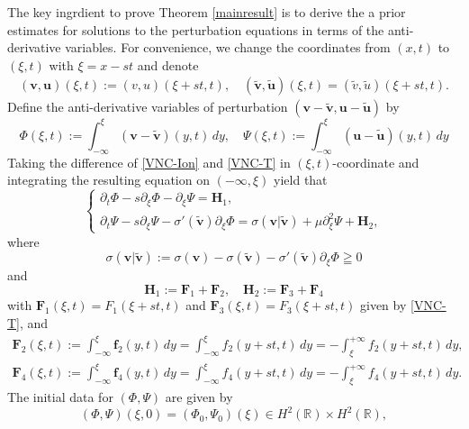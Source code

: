 \documentclass[12pt,reqno]{amsart}
\numberwithin{equation}{section}
\def\p{\partial}
\def\R{\mathbb{R}}
\def\vt{\tilde{v}}
\begin{document}
The key ingrdient to prove Theorem \ref{mainresult} is to derive the a prior estimates for solutions to the perturbation equations in terms of the anti-derivative variables. For convenience, we change the coordinates from $(x,t)$ to $(\xi,t)$ with $\xi=x-st$ and denote 
\begin{align*}
	(\mathbf{v},\mathbf{u})(\xi,t):=(v,u)(\xi+st,t), \quad (\tilde{\mathbf{v}},\tilde{\mathbf{u}})(\xi,t)=(\vt,\tilde{u})(\xi+st,t).
\end{align*}
Define the anti-derivative variables of  perturbation $(\mathbf{v}-\mathbf{\tilde{v}},\mathbf{u}-\mathbf{\tilde{u}})$ by
\begin{equation}\label{adv}
	\Phi(\xi,t):=\int_{-\infty}^{\xi}(\mathbf{v}-\mathbf{\tilde{v}})(y,t) \,dy ,\quad \Psi(\xi,t):=\int_{-\infty}^{\xi}(\mathbf{u}-\mathbf{\tilde{u}})(y,t) \,dy
\end{equation}
Taking the difference of  \eqref{VNC-Ion} and \eqref{VNC-T} in $(\xi, t)$-coordinate and integrating the resulting equation on $(-\infty,\xi)$ yield that 
\begin{equation}\label{system2}
	\begin{cases}
		\p_t\Phi-s\p_{\xi}\Phi-\p_{\xi}\Psi=\mathbf{H}_1,\\
		\p_t\Psi-s\p_{\xi}\Psi-\sigma'(\mathbf{\tilde{v}})\p_{\xi}\Phi=\sigma(\mathbf{v}|\mathbf{\tilde{v}})+\mu \p^2_{\xi}\Psi+\mathbf{H}_2,
	\end{cases}
\end{equation}
where
\begin{equation}\label{hterm}
	\sigma(\mathbf{v}|\mathbf{\tilde{v}}):=\sigma(\mathbf{v})-\sigma(\mathbf{\tilde{v}})-\sigma'(\mathbf{\tilde{v}})\p_{\xi}\Phi\geqq 0
\end{equation}
and 
\begin{equation}\label{h1h2}
	\mathbf{H}_1:=\mathbf{F}_1+\mathbf{F}_2, \quad \mathbf{H}_2:=\mathbf{F}_3+\mathbf{F}_4
\end{equation}
with $\mathbf{F}_1(\xi,t)=F_1(\xi+st,t)$ and $\mathbf{F}_3(\xi,t)=F_3(\xi+st,t)$ given by \eqref{VNC-T}, and 
\begin{align*}
	\mathbf{F}_2(\xi,t):=\int_{-\infty}^{\xi}\mathbf{f}_2(y,t)  \,dy=\int_{-\infty}^{\xi}f_2(y+st,t)  \,dy=-\int_{\xi}^{+\infty}f_2(y+st,t)  \,dy,\\
	\mathbf{F}_4(\xi,t):=\int_{-\infty}^{\xi}\mathbf{f}_4(y,t)  \,dy=\int_{-\infty}^{\xi}f_4(y+st,t)  \,dy=-\int_{\xi}^{+\infty}f_4(y+st,t)  \,dy.
\end{align*}
The initial data for $(\Phi,\Psi)$ are given by
\begin{equation}\label{newinitial}
	(\Phi,\Psi)(\xi,0)=(\Phi_0,\Psi_0)(\xi) \in H^2(\R) \times H^2(\R),
\end{equation}
\end{document}
